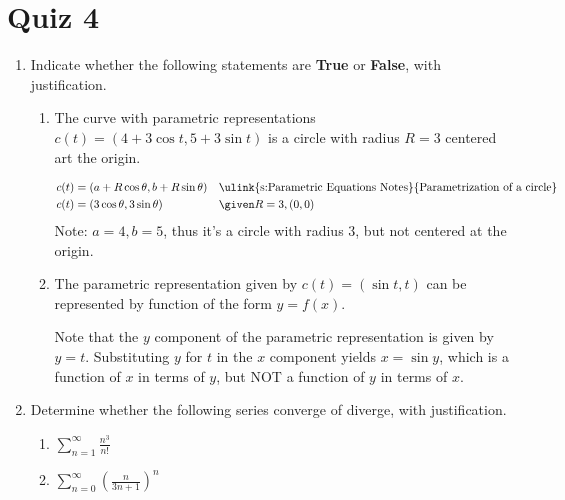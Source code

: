 \section{Quiz 4}
\begin{enumerate}
  \item Indicate whether the following statements are \textbf{True} or
    \textbf{False}, with justification.

  \begin{enumerate}[itemsep=22em]
    \item The curve with parametric representations \(c(t) = (4+3\cos t, 5 + 3
      \sin t)\) is a circle with radius \(R= 3\) centered art the origin.

      \begin{align*}
        c(t) &= (a + R \cos \theta, b + R \sin \theta)
        &&\text{\ulink{s:Parametric Equations Notes}{Parametrization of a circle}} \\
        c(t) &= (3 \cos \theta, 3\sin \theta)
        && \given R = 3, (0, 0)
      \end{align*}
      Note: \(a = 4, b = 5\), thus it's a circle with radius 3, but not centered at
      the origin.

    \vspace{-4em}
    \item The parametric representation given by \(c(t) = (\sin t, t)\) can be
      represented by function of the form \(y=f(x)\).


      Note that the \(y\) component of the parametric representation is given
      by \(y=t\). Substituting \(y\) for \(t\) in the \(x\) component yields
      \(x= \sin y\), which is a function of \(x\) in terms of \(y\), but NOT a
      function of \(y\) in terms of \(x\).
  \end{enumerate}

\newpage %
  \item Determine whether the following series converge of diverge, with
    justification.
    \begin{enumerate}[itemsep=22em]
      \item \(\displaystyle \sum_{n=1}^{\infty} \frac{n^3}{n!} \)

      \item \(\displaystyle \sum_{n=0}^{\infty} \left( \frac{n}{3n+1} \right)^n  \)
    \end{enumerate}


\end{enumerate}
